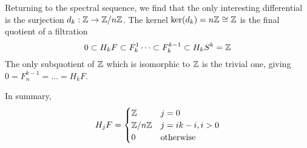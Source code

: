 \begin{example}
Returning to the spectral sequence, we find that the only interesting differential is the surjection $d_k:\mathbb{Z}\rightarrow \mathbb{Z}/n\mathbb{Z}$. The kernel $\text{ker}(d_k)=n\mathbb{Z}\cong \mathbb{Z}$ is the final quotient of a filtration
$$0\subset H_kF\subset F^{1}_k \dots \subset F^{k-1}_k\subset H_kS^k=\mathbb{Z}$$
The only subquotient of $\mathbb{Z}$ which is isomorphic to $\mathbb{Z}$ is the trivial one, giving $0=F^{k-1}_n=\dots=H_kF$. 

In summary,
$$H_jF=\begin{cases} 
      \mathbb{Z}  & j=0\\
      \mathbb{Z}/n\mathbb{Z} & j= ik-i, i>0 \\
      0 & \text{otherwise}
   \end{cases}
$$

\end{example}

